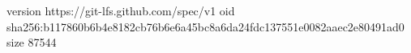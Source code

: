 version https://git-lfs.github.com/spec/v1
oid sha256:b117860b6b4e8182cb76b6e6a45bc8a6da24fdc137551e0082aaec2e80491ad0
size 87544
